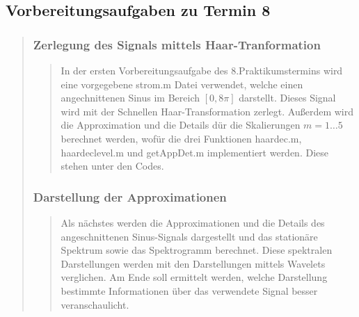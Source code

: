     \subsection{Vorbereitungsaufgaben zu Termin 8}
    \begin{quote}
    
        \subsubsection{Zerlegung des Signals mittels Haar-Tranformation}
        \begin{quote}
        
        In der ersten Vorbereitungsaufgabe des 8.Praktikumstermins wird eine
        vorgegebene strom.m Datei verwendet, welche einen angechnittenen Sinus
        im Bereich $[0,8\pi]$ darstellt. Dieses Signal wird mit der Schnellen
        Haar-Transformation zerlegt. Außerdem wird die Approximation und die
        Details dür die Skalierungen $m = 1 \ldots 5$ berechnet werden, wofür
        die drei Funktionen haardec.m, haardeclevel.m und getAppDet.m
        implementiert werden. Diese stehen unter den Codes.
        
        \end{quote}%
        
        
        \subsubsection{Darstellung der Approximationen}
        \begin{quote}
        
        Als nächstes werden die Approximationen und die Details des
        angeschnittenen Sinus-Signals dargestellt und das stationäre Spektrum
        sowie das Spektrogramm berechnet. Diese spektralen Darstellungen werden
        mit den Darstellungen mittels Wavelets verglichen. Am Ende soll
        ermittelt werden, welche Darstellung bestimmte Informationen über das
        verwendete Signal besser veranschaulicht.
        

\end{quote}
\end{quote}
